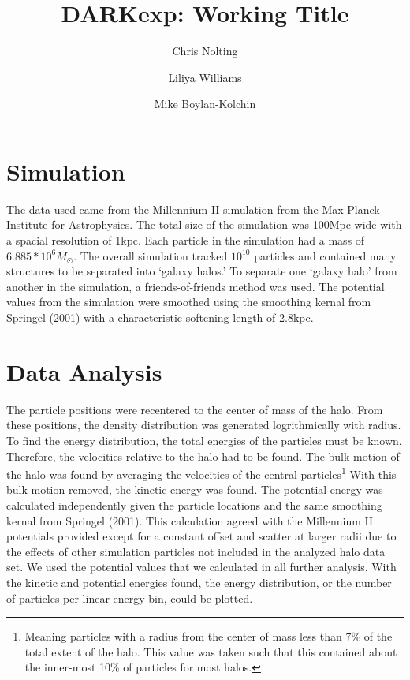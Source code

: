 \documentclass[12pt]{article}
\begin{document}
\setlength\parindent{24pt}
\renewcommand{\thefootnote}{\fnsymbol{footnote}}

\title{DARKexp: Working Title}
\author{Chris Nolting \and Liliya Williams \and Mike
Boylan-Kolchin}

\maketitle

\section*{Simulation}

The data used came from the Millennium II simulation from the Max Planck Institute for Astrophysics. The total size of the simulation was 100Mpc wide with a spacial resolution of 1kpc. Each particle in the simulation had a mass of $6.885*10^6  M_\odot$. The overall simulation tracked $10^{10}$ particles and contained many structures to be separated into `galaxy halos.' To separate one `galaxy halo' from another in the simulation, a friends-of-friends method was used. The potential values from the simulation were smoothed using the smoothing kernal from Springel (2001) with a characteristic softening length of 2.8kpc.

\section*{Data Analysis}

The particle positions were recentered to the center of mass of the halo. From these positions, the density distribution was generated logrithmically with radius. To find the energy distribution, the total energies of the particles must be known. Therefore, the velocities relative to the halo had to be found. The bulk motion of the halo was found by averaging the velocities of the central particles\footnote{\scriptsize Meaning particles with a radius from the center of mass less than 7\% of the total extent of the halo. This value was taken such that this contained about the inner-most 10\% of particles for most halos.} With this bulk motion removed, the kinetic energy was found. The potential energy was calculated independently given the particle locations and the same smoothing kernal from Springel (2001). This calculation agreed with the Millennium II potentials provided except for a constant offset and scatter at larger radii due to the effects of other simulation particles not included in the analyzed halo data set. We used the potential values that we calculated in all further analysis. With the kinetic and potential energies found, the energy distribution, or the number of particles per linear energy bin, could be plotted.
\end{document}
